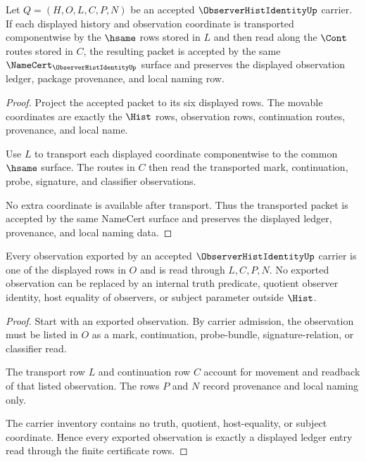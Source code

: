 \begin{theorem}\label{thm:observer-hist-identity-transport-stability}
Let $Q=(H,O,L,C,P,N)$ be an accepted $\ObserverHistIdentityUp$ carrier. If each displayed history and observation coordinate is transported componentwise by the $\hsame$ rows stored in $L$ and then read along the $\Cont$ routes stored in $C$, the resulting packet is accepted by the same $\NameCert_{\ObserverHistIdentityUp}$ surface and preserves the displayed observation ledger, package provenance, and local naming row.
\end{theorem}
\begin{proof}
Project the accepted packet to its six displayed rows. The movable coordinates are exactly the $\Hist$ rows, observation rows, continuation routes, provenance, and local name.

Use $L$ to transport each displayed coordinate componentwise to the common $\hsame$ surface. The routes in $C$ then read the transported mark, continuation, probe, signature, and classifier observations.

No extra coordinate is available after transport. Thus the transported packet is accepted by the same NameCert surface and preserves the displayed ledger, provenance, and local naming data.
\end{proof}

\begin{theorem}\label{thm:observer-hist-identity-ledger-exactness}
Every observation exported by an accepted $\ObserverHistIdentityUp$ carrier is one of the displayed rows in $O$ and is read through $L,C,P,N$. No exported observation can be replaced by an internal truth predicate, quotient observer identity, host equality of observers, or subject parameter outside $\Hist$.
\end{theorem}
\begin{proof}
Start with an exported observation. By carrier admission, the observation must be listed in $O$ as a mark, continuation, probe-bundle, signature-relation, or classifier read.

The transport row $L$ and continuation row $C$ account for movement and readback of that listed observation. The rows $P$ and $N$ record provenance and local naming only.

The carrier inventory contains no truth, quotient, host-equality, or subject coordinate. Hence every exported observation is exactly a displayed ledger entry read through the finite certificate rows.
\end{proof}

